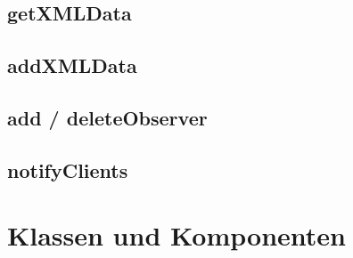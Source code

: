 \subsection {getXMLData}

\subsection {addXMLData}

\subsection {add / deleteObserver}

\subsection {notifyClients}

\section{Klassen und Komponenten}
